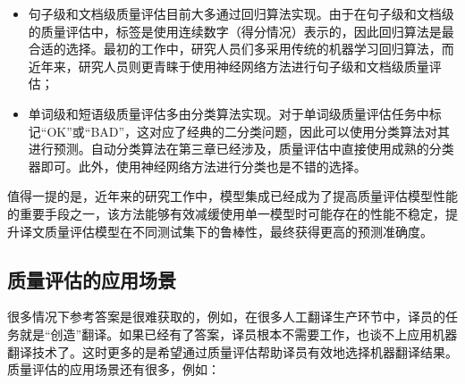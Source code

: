 \begin{itemize}
\vspace{0.5em}
\item 句子级和文档级质量评估目前大多通过回归算法实现。由于在句子级和文档级的质量评估中，标签是使用连续数字（得分情况）表示的，因此回归算法是最合适的选择。最初的工作中，研究人员们多采用传统的机器学习回归算法，而近年来，研究人员则更青睐于使用神经网络方法进行句子级和文档级质量评估；
\vspace{0.5em}
\item 单词级和短语级质量评估多由分类算法实现。对于单词级质量评估任务中标记“OK”或“BAD”，这对应了经典的二分类问题，因此可以使用分类算法对其进行预测。自动分类算法在第三章已经涉及，质量评估中直接使用成熟的分类器即可。此外，使用神经网络方法进行分类也是不错的选择。
\vspace{0.5em}
\end{itemize}

\parinterval 值得一提的是，近年来的研究工作中，模型集成已经成为了提高质量评估模型性能的重要手段之一，该方法能够有效减缓使用单一模型时可能存在的性能不稳定，提升译文质量评估模型在不同测试集下的鲁棒性，最终获得更高的预测准确度。

\subsection{质量评估的应用场景}

\parinterval 很多情况下参考答案是很难获取的，例如，在很多人工翻译生产环节中，译员的任务就是“创造”翻译。如果已经有了答案，译员根本不需要工作，也谈不上应用机器翻译技术了。这时更多的是希望通过质量评估帮助译员有效地选择机器翻译结果。质量评估的应用场景还有很多，例如：

